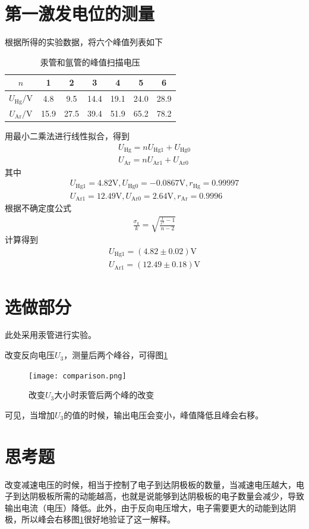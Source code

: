 \documentclass{ctexart}
\begin{document}
	\section{第一激发电位的测量}
	根据所得的实验数据，将六个峰值列表如下
	\begin{table}[H]
		\begin{center}
			\caption{汞管和氩管的峰值扫描电压}
			\begin{tabular}{c|cccccc}
				$n$&1&2&3&4&5&6\\
				\hline
				$U_{\mathrm{Hg}}/\mathrm{V}$&4.8&9.5&14.4&19.1&24.0&28.9 \\
				\hline
				$U_{\mathrm{Ar}}/\mathrm{V}$&15.9&27.5&39.4&51.9&65.2&78.2\\
				\hline
			\end{tabular}
		\end{center}
	\end{table}
	用最小二乘法进行线性拟合，得到
	\begin{align}
		U_{\mathrm{Hg}}=nU_{\mathrm{Hg1}}+U_{\mathrm{Hg0}}\\
		U_{\mathrm{Ar}}=nU_{\mathrm{Ar1}}+U_{\mathrm{Ar0}}
	\end{align}
	其中
	\begin{align}
		U_{\mathrm{Hg1}}=4.82\mathrm{V},U_{\mathrm{Hg0}}=-0.0867\mathrm{V},r_{\mathrm{Hg}}=0.99997\\
		U_{\mathrm{Ar1}}=12.49\mathrm{V},U_{\mathrm{Ar0}}=2.64\mathrm{V},r_{\mathrm{Ar}}=0.9996
	\end{align}
	根据不确定度公式
	\begin{align}
		\frac{\sigma_k}{k}=\sqrt{\frac{\frac{1}{r^2}-1}{n-2}}
	\end{align}
	计算得到
	\begin{align}
		U_{\mathrm{Hg1}}=(4.82\pm0.02)\mathrm{V}\\
		U_{\mathrm{Ar1}}=(12.49\pm0.18)\mathrm{V}
	\end{align}
	\section{选做部分}
	此处采用汞管进行实验。
	
	改变反向电压$U_3$，测量后两个峰谷，可得图\ref{comparison}
	\begin{figure}[H]
		\centering
		\texttt{[image: comparison.png]}
		\caption{改变$U_3$大小时汞管后两个峰的改变}
		\label{comparison}
	\end{figure}
	可见，当增加$U_3$的值的时候，输出电压会变小，峰值降低且峰会右移。
	\section{思考题}
	改变减速电压的时候，相当于控制了电子到达阴极板的数量，当减速电压越大，电子到达阴极板所需的动能越高，也就是说能够到达阴极板的电子数量会减少，导致输出电流（电压）降低。此外，由于反向电压增大，电子需要更大的动能到达阴极，所以峰会右移图\ref{comparison}很好地验证了这一解释。
\end{document}
